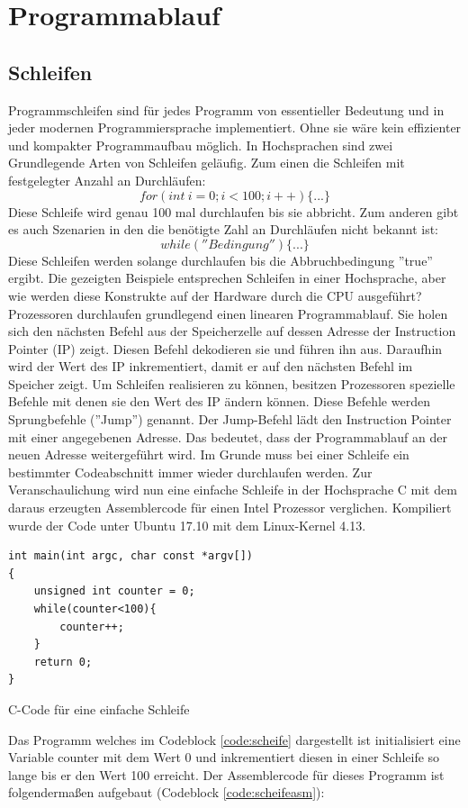 \documentclass[12pt]{article}
\begin{document}
\newpage
\section{Programmablauf}	\label{sec:programmablauf}
\subsection{Schleifen}
Programmschleifen sind für jedes Programm von essentieller Bedeutung und in jeder modernen Programmiersprache implementiert. Ohne sie wäre kein effizienter und kompakter Programmaufbau möglich. In Hochsprachen sind zwei Grundlegende Arten von Schleifen geläufig. Zum einen die Schleifen mit festgelegter Anzahl an Durchläufen: 
$$for(int \ i=0; i<100; i++)\{...\}$$
Diese Schleife wird genau 100 mal durchlaufen bis sie abbricht. Zum anderen gibt es auch Szenarien in den die benötigte Zahl an Durchläufen nicht bekannt ist:
$$while(''Bedingung'')\{...\}$$
Diese Schleifen werden solange durchlaufen bis die Abbruchbedingung ''true'' ergibt. Die gezeigten Beispiele entsprechen Schleifen in einer Hochsprache, aber wie werden diese Konstrukte auf der Hardware durch die CPU ausgeführt?
Prozessoren durchlaufen grundlegend einen linearen Programmablauf. Sie holen sich den nächsten Befehl aus der Speicherzelle auf dessen Adresse der Instruction Pointer (IP) zeigt. Diesen Befehl dekodieren sie und führen ihn aus. Daraufhin wird der Wert des IP inkrementiert, damit er auf den nächsten Befehl im Speicher zeigt. Um Schleifen realisieren zu können, besitzen Prozessoren spezielle Befehle mit denen sie den Wert des IP ändern können. Diese Befehle werden Sprungbefehle (''Jump'') genannt. Der Jump-Befehl lädt den Instruction Pointer mit einer angegebenen Adresse. Das bedeutet, dass der Programmablauf an der neuen Adresse weitergeführt wird. Im Grunde muss bei einer Schleife ein bestimmter Codeabschnitt immer wieder durchlaufen werden. Zur Veranschaulichung wird nun eine einfache Schleife in der Hochsprache C mit dem daraus erzeugten Assemblercode für einen Intel Prozessor verglichen. Kompiliert wurde der Code unter Ubuntu 17.10 mit dem Linux-Kernel 4.13.

\begin{code}[!htb]
\begin{lstlisting}
int main(int argc, char const *argv[])
{
	unsigned int counter = 0;
	while(counter<100){
		counter++;
	}
	return 0;
}
\end{lstlisting}
\caption[C Code einfache Schleife]{C-Code für eine einfache Schleife}
\label{code:scheife}
\end{code}
\newpage
\par\bigskip\noindent Das Programm welches im Codeblock \ref{code:scheife} dargestellt ist initialisiert eine Variable counter mit dem Wert 0 und inkrementiert diesen in einer Schleife so lange bis er den Wert 100 erreicht. Der Assemblercode für dieses Programm ist folgendermaßen aufgebaut (Codeblock \ref{code:scheifeasm}):
\end{document}
